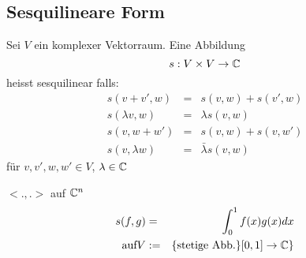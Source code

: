 \subsection{Sesquilineare Form}
\begin{Def}
  Sei $V$ ein komplexer Vektorraum. Eine Abbildung
  \[s:V\times V\to \mathbb{C}\]
  heisst sesquilinear falls:
  \begin{align*}
    s(v+v',w)&=& s(v,w)+s(v',w)\\
    s(\lambda v,w)&=& \lambda s(v,w)\\
    s(v,w+w')&=& s(v,w)+s(v,w')\\
    s(v,\lambda w)&=& \bar{\lambda} s(v,w)
  \end{align*}
  für $v,v',w,w'\in V$, $\lambda\in\mathbb{C}$
\end{Def}
\begin{Bsp}
  $<.,.>$ auf $\mathbb{C}^n$
  \begin{align*}
    s(f,g)&=& \int^1_0f(x)g(x)dx\\
    \text{auf} V&:=& \{\text{stetige Abb.}\}[0,1]\to\mathbb{C}\}
  \end{align*}
\end{Bsp}
